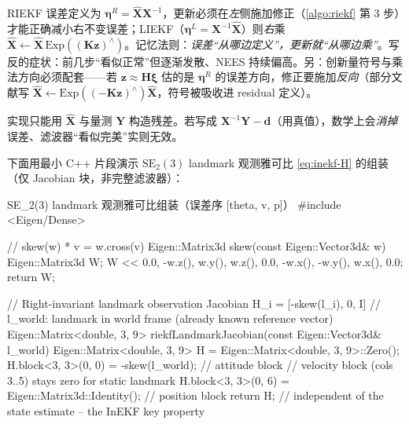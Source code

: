 \begin{pitfall}[更新步用错乘法方向]
RIEKF 误差定义为 $\boldsymbol{\eta}^R=\hat{\mathbf{X}}\mathbf{X}^{-1}$，更新必须在\emph{左}侧施加修正（\cref{algo:riekf} 第 3 步）才能正确减小右不变误差；LIEKF（$\boldsymbol{\eta}^L=\mathbf{X}^{-1}\hat{\mathbf{X}}$）则\emph{右}乘 $\hat{\mathbf{X}}\leftarrow\hat{\mathbf{X}}\,\mathrm{Exp}((\mathbf{K}\mathbf{z})^\wedge)$。记忆法则：\emph{误差“从哪边定义”，更新就“从哪边乘”}。写反的症状：前几步“看似正常”但逐渐发散、NEES 持续偏高。另：创新量符号与乘法方向必须配套——若 $\mathbf{z}\approx\mathbf{H}\boldsymbol{\xi}$ 估的是 $\boldsymbol{\eta}^R$ 的误差方向，修正要施加\emph{反向}（部分文献写 $\hat{\mathbf{X}}\leftarrow\mathrm{Exp}((-\mathbf{K}\mathbf{z})^\wedge)\hat{\mathbf{X}}$，符号被吸收进 residual 定义）。
\end{pitfall}

\begin{pitfall}
实现只能用 $\hat{\mathbf{X}}$ 与量测 $\mathbf{Y}$ 构造残差。若写成 $\mathbf{X}^{-1}\mathbf{Y}-\mathbf{d}$（用真值），数学上会\emph{消掉}误差、滤波器“看似完美”实则无效。
\end{pitfall}

下面用最小 C++ 片段演示 $\mathrm{SE}_2(3)$ landmark 观测雅可比 \cref{eq:inekf-H} 的组装（仅 Jacobian 块，非完整滤波器）：

\begin{codebox}[C++]{SE\_2(3) landmark 观测雅可比组装（误差序 [theta, v, p]）}
#include <Eigen/Dense>

// skew(w) * v = w.cross(v)
Eigen::Matrix3d skew(const Eigen::Vector3d& w) {
    Eigen::Matrix3d W;
    W <<   0.0, -w.z(),  w.y(),
         w.z(),    0.0, -w.x(),
        -w.y(),  w.x(),    0.0;
    return W;
}

// Right-invariant landmark observation Jacobian H_i = [-skew(l_i), 0, I]
// l_world: landmark in world frame (already known reference vector)
Eigen::Matrix<double, 3, 9> riekfLandmarkJacobian(const Eigen::Vector3d& l_world) {
    Eigen::Matrix<double, 3, 9> H = Eigen::Matrix<double, 3, 9>::Zero();
    H.block<3, 3>(0, 0) = -skew(l_world);   // attitude block
    // velocity block (cols 3..5) stays zero for static landmark
    H.block<3, 3>(0, 6) = Eigen::Matrix3d::Identity();  // position block
    return H;   // independent of the state estimate -- the InEKF key property
}
\end{codebox}

